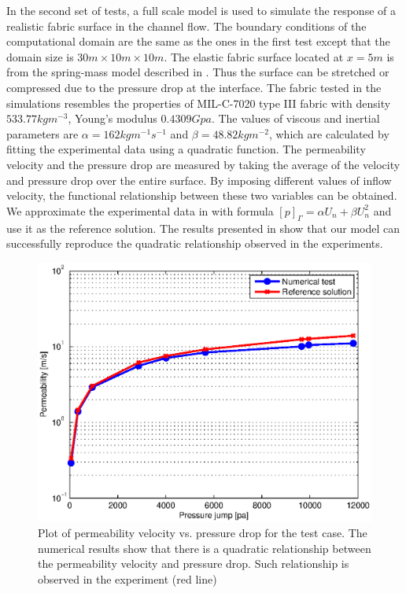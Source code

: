 In the second set of tests, a full scale model is used to simulate the response
of a realistic fabric surface in the channel flow.  The boundary conditions of
the computational domain are the same as the ones in the first test except that
the domain size is $30m\times 10m\times 10m$. The elastic fabric surface
located at $x = 5m$ is from the spring-mass model described in \cite{Shi2015}.
Thus the surface can be stretched or compressed due to the pressure drop at the
interface.  The fabric tested in the simulations resembles the properties of
MIL-C-7020 type III fabric \cite{ewing1978recovery} with density
$533.77kgm^{-3}$, Young's modulus $0.4309Gpa$. The values of viscous and
inertial parameters are $\alpha = 162kgm^{-1}s^{-1}$ and $\beta =
48.82kgm^{-2}$, which are calculated by fitting the experimental data using a
quadratic function.  The permeability velocity and the pressure drop are
measured by taking the average of the velocity and pressure drop over the
entire surface.  By imposing different values of inflow velocity, the
functional relationship between these two variables can be obtained. We
approximate the experimental data in \cite{ewing1978recovery} with formula
$[p]_{\Gamma} = \alpha U_n + \beta U_n^2$ and use it as the reference solution.
The results presented in  show that our model can successfully
reproduce the quadratic relationship observed in the experiments.

\begin{figure}[h] \centering
\includegraphics[width=1.0\columnwidth]{Figures/curve} \caption{Plot
of permeability velocity vs. pressure drop for the test case.
The numerical results show that there
is a quadratic relationship between the permeability velocity and
pressure drop. Such relationship is observed in the experiment (red line)}
\label{fig:curve} \end{figure}

